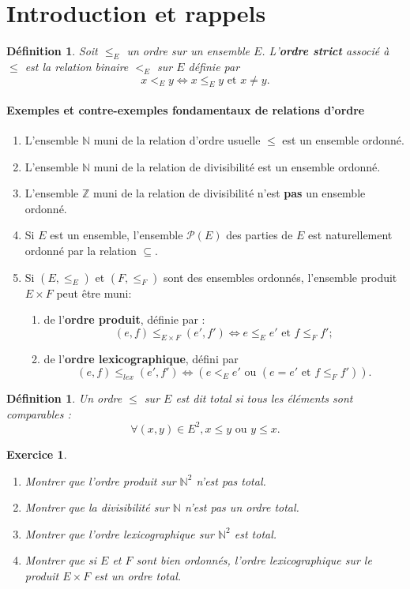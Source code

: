 \documentclass[12pt]{article}
\newtheorem*{exo}{Exercice}
\newtheorem{definition}[thm]{Définition}
\newcommand{\N}{\mathbb{N}}
\newcommand{\Z}{\mathbb{Z}}
\begin{document}
\section{Introduction et rappels}

\begin{definition}
Soit $\leq_E$ un ordre sur un ensemble $E$.
L'\textbf{ordre strict} associé à $\leq$ est la relation binaire $<_E$ sur $E$ définie par 
\[ x <_E y \iff x\leq_E y \text{ et } x\neq y.\]
 \end{definition}

\paragraph{Exemples  et contre-exemples fondamentaux de relations d'ordre}
\begin{enumerate}
\item L'ensemble $\N$ muni de la relation d'ordre usuelle $\leq$ est un ensemble ordonné. 
\item L'ensemble $\N$ muni de la relation de divisibilité est un ensemble ordonné.
\item L'ensemble $\Z$ muni de la relation de divisibilité n'est \textbf{pas} un ensemble ordonné.
\item Si $E$ est un ensemble, l'ensemble $\mathcal P(E)$ des parties de $E$ est naturellement  ordonné par la relation $\subseteq$.
\item Si $(E,\leq_E)$ et $(F,\leq_F)$ sont des ensembles ordonnés, l'ensemble produit $E\times F$ peut être muni:
\begin{enumerate}
\item de l'\textbf{ordre produit}, définie par :
\[ (e,f) \leq_{E\times F} (e',f') \iff e\leq_E e' \text{ et }f\leq_F f';\]
\item de l'\textbf{ordre lexicographique}, défini par 
\[ (e,f) \leq_{lex} (e',f') \iff (e <_E e' \text{ ou } (e=e' \text{ et }f\leq_F f') ).\]
\end{enumerate}
\end{enumerate}

 
 
 \begin{definition}
 Un ordre $\leq$ sur $E$ est dit \emph{total} si tous les éléments sont comparables : 
 \[ \forall (x,y)\in E^2, x\leq y \text{ ou } y\leq x.\]
 \end{definition}
 
\begin{exo}
\begin{enumerate}
\item Montrer que l'ordre produit sur $\N^2$ n'est pas total.
\item Montrer que la divisibilité sur $\N$ n'est pas un ordre total.
\item Montrer que l'ordre lexicographique sur $\N^2$ est total.
\item Montrer que si $E$ et $F$ sont bien ordonnés, l'ordre lexicographique sur le produit $E\times F$ est un ordre total.
\end{enumerate}
\end{exo}
\end{document}
